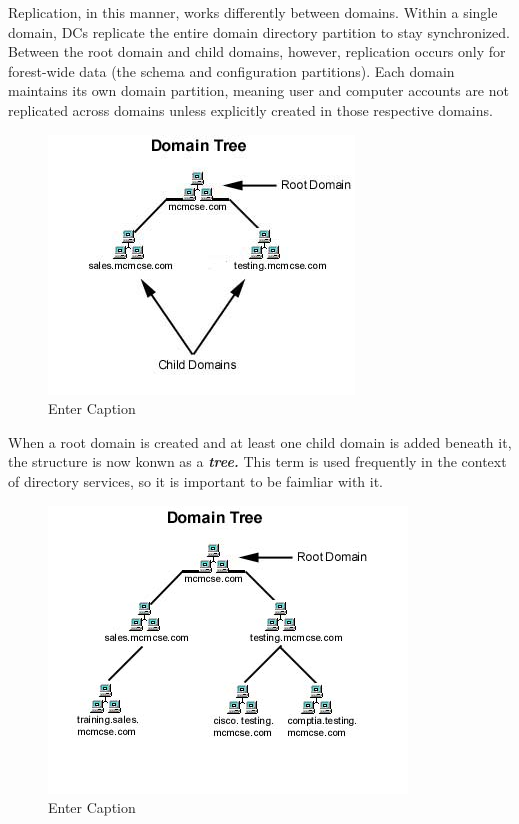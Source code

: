 Replication, in this manner, works differently between domains. Within a single domain, DCs replicate the entire domain directory partition to stay synchronized. Between the root domain and child domains, however, replication occurs only for forest-wide data (the schema and configuration partitions). Each domain maintains its own domain partition, meaning user and computer accounts are not replicated across domains unless explicitly created in those respective domains.
\begin{figure}
    \centering
    \includegraphics[width=0.75\linewidth]{ad1.png}
    \caption{Enter Caption}
    \label{fig:placeholder}
\end{figure}
When a root domain is created and at least one child domain is added beneath it, the structure is now konwn as a \textbf{\textit{tree.}} This term is used frequently in the context of directory services, so it is important to be faimliar with it.
\begin{figure}
    \centering
    \includegraphics[width=0.75\linewidth]{ad2.png}
    \caption{Enter Caption}
    \label{fig:placeholder}
\end{figure}

